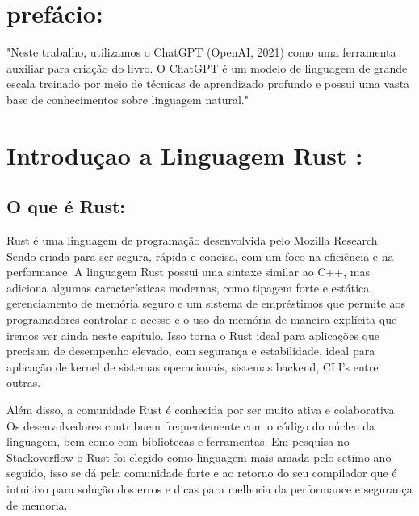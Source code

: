 \documentclass[12pt,a4paper,oneside]{abntex2}
\begin{document}

\tableofcontents*
\cleardoublepage


\textual

\chapter{prefácio:}
"Neste trabalho, utilizamos o ChatGPT (OpenAI, 2021) como uma ferramenta auxiliar para criação do livro. O ChatGPT é um modelo de linguagem de grande escala treinado por meio de técnicas de aprendizado profundo e possui uma vasta base de conhecimentos sobre linguagem natural."



\chapter{Introduçao a Linguagem Rust :}




 \section{O que é Rust:}
Rust é uma linguagem de programação desenvolvida pelo Mozilla Research. Sendo criada para ser segura, rápida e concisa, com um foco na eficiência e na performance.
A linguagem Rust possui uma sintaxe similar ao C++, mas adiciona algumas características modernas, como tipagem forte e estática, gerenciamento de memória seguro e um sistema de empréstimos que permite aos programadores controlar o acesso e o uso da memória de maneira explícita que iremos ver ainda neste capítulo. Isso torna o Rust ideal para aplicações que precisam de desempenho elevado, com segurança e estabilidade, ideal para aplicação de kernel de sistemas operacionais, sistemas backend, CLI's entre outras. 

Além disso, a comunidade Rust é conhecida por ser muito ativa e colaborativa. Os desenvolvedores contribuem frequentemente com o código do núcleo da linguagem, bem como com bibliotecas e ferramentas. Em pesquisa no Stackoverflow o Rust foi elegido como linguagem mais amada pelo setimo ano seguido, isso se dá pela comunidade forte e ao retorno do seu compilador que é intuitivo para solução dos erros e dicas para melhoria da performance e segurança de memoria. 
\end{document}
